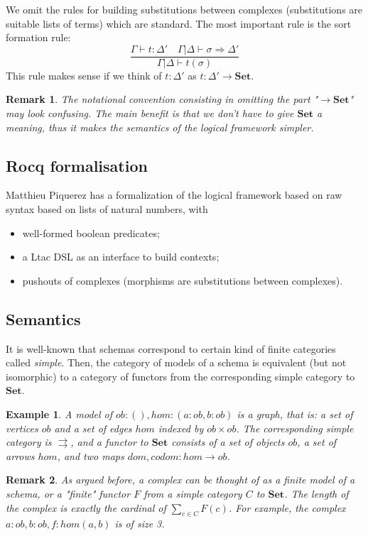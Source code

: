 \documentclass{article}
\newtheorem{example}{Example}
\newtheorem{remark}{Remark}
\begin{document}
We omit the rules for building substitutions between complexes (substitutions are suitable lists of terms) which are standard.
The most important rule is the sort formation rule: 
\[
\dfrac{Γ⊢t : Δ'\quad Γ| Δ⊢σ ⇒ Δ'}{Γ|Δ⊢t(σ)}
\]
This rule makes sense if we think of $t:Δ'$ as $t:Δ' → 𝐒𝐞𝐭$.
\begin{remark}
    The notational convention consisting in 
    omitting the part "$→𝐒𝐞𝐭$" may look confusing.
    The main benefit is that we don't have to give $𝐒𝐞𝐭$ a meaning, 
    thus it makes the semantics of the logical framework simpler.
\end{remark}
\subsection{Rocq formalisation}
Matthieu Piquerez has a formalization of the logical framework
based on raw syntax based on lists of natural numbers, with 
\begin{itemize}
    \item well-formed boolean predicates;
    \item a Ltac DSL as an interface to build contexts;
    \item pushouts of complexes (morphisms are substitutions between complexes).
\end{itemize} 
\subsection{
Semantics
}
It is well-known that schemas correspond to certain kind of finite categories called \emph{simple}.
Then, the category of models of a schema is equivalent (but not isomorphic) to a 
category of functors from the corresponding simple category to $𝐒𝐞𝐭$.
\begin{example}
    A model of $ob:(), hom: (a:ob,b:ob)$ is a graph, that is: a set of vertices $ob$ and a set of edges $hom$ indexed by $ob × ob$.
    The corresponding simple category is $⇉$, and a functor to $𝐒𝐞𝐭$ consists of 
    a set of objects $ob$, a set of arrows $hom$, and two maps $dom, codom : hom → ob$.
\end{example}
\begin{remark}
    As argued before, a complex can be thought of as a finite model of a schema, or a "finite" functor $F$ from a simple category $C$ to $𝐒𝐞𝐭$. The length of the complex is exactly the cardinal 
    of $∑_{c∈C} F(c)$. For example, the complex $a:ob, b:ob, f:hom(a,b)$ is of size 3.
\end{remark}
\end{document}

